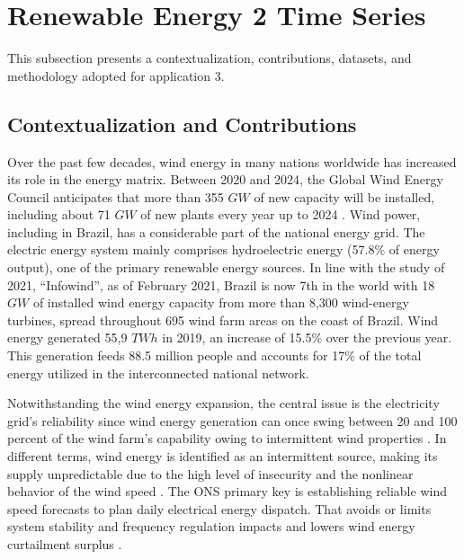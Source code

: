 \section{Renewable Energy 2 Time Series} \label{sec:renewable2}

This subsection presents a contextualization, contributions, datasets, and methodology adopted for application 3.

\subsection{Contextualization and Contributions}

Over the past few decades, wind energy in many nations worldwide has increased its role in the energy matrix. Between 2020 and 2024, the Global Wind Energy Council anticipates that more than 355 $GW$ of new capacity will be installed, including about 71 $GW$ of new plants every year up to 2024 \cite{globalwindenergycouncilgwec2020Market}. Wind power, including in Brazil, has a considerable part of the national energy grid. The electric energy system mainly comprises hydroelectric energy (57.8\% of energy output), one of the primary renewable energy sources. In line with the  study of 2021, ``Infowind'', as of February 2021, Brazil is now 7th in the world with 18 $GW$ of installed wind energy capacity from more than 8,300 wind-energy turbines, spread throughout 695 wind farm areas on the coast of Brazil. Wind energy generated 55,9 $TWh$ in 2019, an increase of 15.5\% over the previous year. This generation feeds 88.5 million people and accounts for 17\% of the total energy utilized in the interconnected national network.

Notwithstanding the wind energy expansion, the central issue is the electricity grid's reliability since wind energy generation can once swing between 20 and 100 percent of the wind farm's capability owing to intermittent wind properties \cite{vatanpour2018Impact}. In different terms, wind energy is identified as an intermittent source, making its supply unpredictable due to the high level of insecurity and the nonlinear behavior of the wind speed \cite{dasilva2021Novel}. The \ac{ONS} primary key is establishing reliable wind speed forecasts to plan daily electrical energy dispatch. That avoids or limits system stability and frequency regulation impacts and lowers wind energy curtailment surplus \cite{moreno2020Multistep}.

